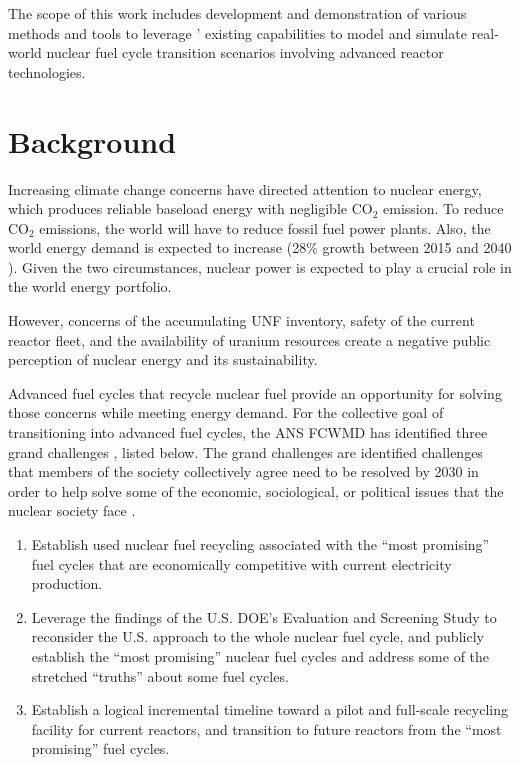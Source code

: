The scope of this work includes development and demonstration of
various methods and tools to leverage \Cyclus' existing
capabilities to model and simulate real-world nuclear fuel cycle
transition scenarios involving advanced reactor technologies.


\section{Background}
Increasing climate change concerns have directed attention
to nuclear energy, which produces reliable baseload energy
with negligible CO$_2$ emission. To reduce CO$_2$ emissions,
the world will have to reduce fossil fuel power plants.
Also, the world energy demand is expected to increase
(28\% growth between 2015 and 2040 \cite{conti_international_2016}).
Given the two circumstances,
nuclear power is expected to play a crucial role in the world energy portfolio.

However, concerns of the accumulating \gls{UNF} inventory,
safety of the current reactor fleet, and the availability of
uranium resources create a negative public perception of
nuclear energy and its sustainability.

Advanced fuel cycles that recycle nuclear fuel 
provide an opportunity for solving those concerns while
meeting energy demand. For the collective goal of transitioning
into advanced fuel cycles, the \gls{ANS} \gls{FCWMD} has identified
three grand challenges \cite{huff_message_2017}, listed below. The grand
challenges are identified challenges that members of the
society collectively agree need to be resolved by
2030 in order to help solve some of the economic, sociological,
or political issues that the nuclear society face \cite{american_nuclear_society_ans_2017}.

\begin{enumerate}
	\item Establish used nuclear fuel recycling associated with the
	``most promising'' fuel cycles that are economically competitive
	with current electricity production.
	\item Leverage the findings of the U.S. \gls{DOE}'s Evaluation
	and Screening Study to reconsider the U.S. approach to the whole
	nuclear fuel cycle, and publicly establish the ``most promising''
	nuclear fuel cycles and address some of the stretched ``truths''
	about some fuel cycles.
	\item Establish a logical incremental timeline toward a pilot
	and full-scale recycling facility for current reactors, and
	transition to future reactors from the ``most promising'' fuel cycles.
\end{enumerate}

